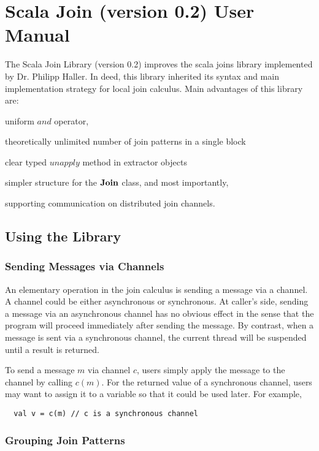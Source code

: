 \section{Scala Join (version 0.2) User Manual}
\label{app_lib}

The Scala Join Library (version 0.2) improves the scala joins library \cite{scala_joins} implemented by Dr. Philipp Haller.  In deed, this library inherited its syntax and main implementation strategy for local join calculus.  Main advantages of this library are: 
\begin{inparaenum}[(i)]
  \item uniform $and$ operator,
  \item theoretically unlimited number of join patterns in a single block
  \item clear typed $unapply$ method in extractor objects
  \item simpler structure for the $\bf{Join}$ class, and most importantly,
  \item supporting communication on distributed join channels.
\end{inparaenum}  

\subsection{Using the Library}
\subsubsection{Sending Messages via Channels}
An elementary operation in the join calculus is sending a message via a channel.  A channel could be either asynchronous or synchronous.  At caller's side, sending a message via an asynchronous channel has no obvious effect in the sense that the program will proceed immediately after sending the message.  By contrast, when a message is sent via a synchronous channel, the current thread will be suspended until a result is returned.  

To send a message $m$ via channel $c$, users simply apply the message to the channel by calling $c(m)$.  For the returned value of a synchronous channel, users may want to assign it to a variable so that it could be used later.  For example,
\begin{lstlisting}
  val v = c(m) // c is a synchronous channel
\end{lstlisting}

\subsubsection{Grouping Join Patterns}


